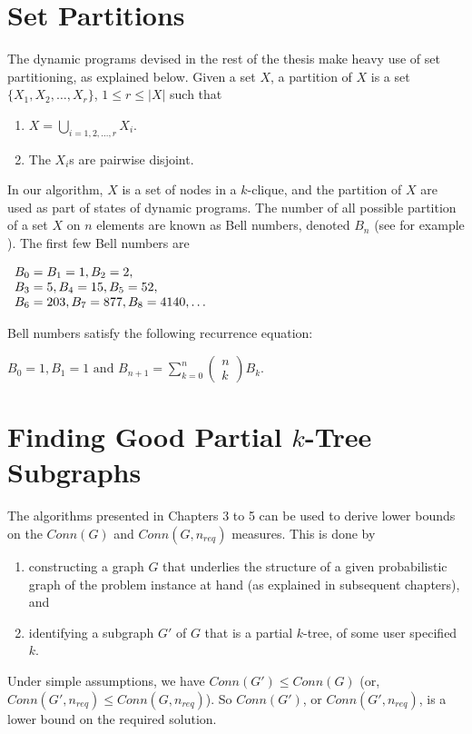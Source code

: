 \section{Set Partitions}
\label{sec:setPartitions}
The dynamic programs devised in the rest of the thesis make heavy use of set partitioning, as explained below. Given a set $X$, a partition of $X$ is a set $\{X_1,X_2,\ldots, X_r\}$, $1\leq r\leq |X|$ such that 
\begin{enumerate}
\item $X=\displaystyle \bigcup_{i=1,2,\ldots,r} X_i$.
\item The $X_i$s are pairwise disjoint.
\end{enumerate}
In our algorithm, $X$ is a set of nodes in a $k$-clique, and the partition of $X$ are used as part of states of dynamic programs.
%
The number of all possible partition of a set $X$ on $n$ elements are known as Bell numbers, denoted $B_n$ (see for example \cite{brualdi2009introduction}).
The first few Bell numbers are 
\begin{center}
$\begin{array}[t]{l}
B_0=B_1=1,B_2=2,\\
B_3=5,B_4=15,B_5=52,\\
B_6=203,B_7=877,B_8=4140, \ldots \\
\end{array}$
\end{center}
Bell numbers satisfy the following recurrence equation:
\begin{center}

$ B_0=1, B_1=1 \mbox{ and } B_{n+1}=\displaystyle \sum_{k=0}^n (\begin{array}{l} n \\ k \end{array})B_k.
$
\end{center}

\section{Finding Good Partial $k$-Tree Subgraphs}
\label{sec:fgpkts}

The algorithms presented in Chapters 3 to 5 can be used to derive lower bounds on the $Conn(G)$ and $Conn(G,n_{req})$ measures. This is done by
\begin{enumerate}
\item  constructing a graph $G$ that underlies the structure of a given probabilistic graph of the problem instance at hand (as explained in subsequent chapters), and
\item  identifying a subgraph $G'$ of $G$ that is a partial $k$-tree, of some user specified $k$.
\end{enumerate}
Under simple assumptions, we have $Conn(G')\leq Conn(G)$ (or, $Conn(G',n_{req})\leq Conn(G,n_{req})$).
So $Conn(G')$, or $Conn(G',n_{req})$, is a lower bound on the required solution.

